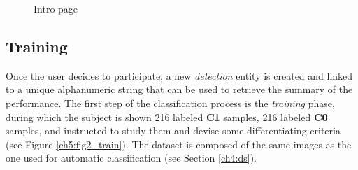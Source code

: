 \begin{figure}[!hbt]
  \centering
{}
  \caption{Intro page}
  \label{ch5:fig1_intro}
\end{figure}  



\vspace{0.5cm}



\subsection{Training}

Once the user decides to participate, a new \textit{detection} entity is created and linked to a unique alphanumeric string that can be used to retrieve the summary of the performance.
The first step of the classification process is the \textit{training} phase, during which the subject is shown 216 labeled \textbf{C1} samples, 216 labeled \textbf{C0} samples, and
instructed to study them and devise some differentiating criteria (see Figure \ref{ch5:fig2_train}). The dataset is composed of the same images as the one used for automatic classification (see Section \ref{ch4:ds}).

